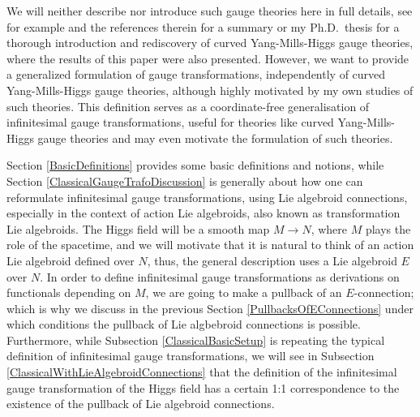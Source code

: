 \documentclass[a4paper,oneside,11pt,leqno]{scrartcl} %
\theoremstyle{plain}
\theoremstyle{remark}
\theoremstyle{definition}
\begin{document}
We will neither describe nor introduce such gauge theories here in full details, see for example \cite{CurvedYMH} and the references therein for a summary or my Ph.D.~thesis \cite{MyThesis} for a thorough introduction and rediscovery of curved Yang-Mills-Higgs gauge theories, where the results of this paper were also presented. However, we want to provide a generalized formulation of gauge transformations, independently of curved Yang-Mills-Higgs gauge theories, although highly motivated by my own studies of such theories. This definition serves as a coordinate-free generalisation of infinitesimal gauge transformations, useful for theories like curved Yang-Mills-Higgs gauge theories and may even motivate the formulation of such theories.

Section \ref{BasicDefinitions} provides some basic definitions and notions, while Section \ref{ClassicalGaugeTrafoDiscussion} is generally about how one can reformulate infinitesimal gauge transformations, using Lie algebroid connections, especially in the context of action Lie algebroids, also known as transformation Lie algebroids. The Higgs field will be a smooth map $M \to N$, where $M$ plays the role of the spacetime, and we will motivate that it is natural to think of an action Lie algebroid defined over $N$, thus, the general description uses a Lie algebroid $E$ over $N$. In order to define infinitesimal gauge transformations as derivations on functionals depending on $M$, we are going to make a pullback of an $E$-connection; which is why we discuss in the previous Section \ref{PullbacksOfEConnections} under which conditions the pullback of Lie algbebroid connections is possible. Furthermore, while Subsection \ref{ClassicalBasicSetup} is repeating the typical definition of infinitesimal gauge transformations, we will see in Subsection \ref{ClassicalWithLieAlgebroidConnections} that the definition of the infinitesimal gauge transformation of the Higgs field has a certain 1:1 correspondence to the existence of the pullback of Lie algebroid connections.
\end{document}
